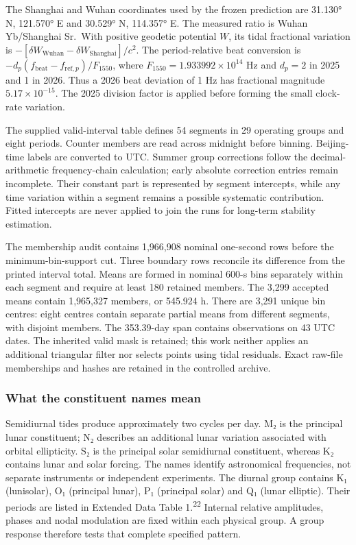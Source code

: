 \documentclass[
  10pt,
  a4paper,
]{article}
\begin{document}
The Shanghai and Wuhan coordinates used by the frozen prediction are
31.130° N, 121.570° E and 30.529° N, 114.357° E. The measured ratio is
Wuhan Yb/Shanghai Sr.~With positive geodetic potential \(W\), its tidal
fractional variation is
\(-[\delta W_{\mathrm{Wuhan}}-\delta W_{\mathrm{Shanghai}}]/c^2\). The
period-relative beat conversion is
\(-d_p(f_{\mathrm{beat}}-f_{{\mathrm{ref}},p})/F_{1550}\), where
\(F_{1550}=1.933992\times10^{14}\) Hz and \(d_p=2\) in 2025 and 1 in
2026. Thus a 2026 beat deviation of 1 Hz has fractional magnitude
\(5.17\times10^{-15}\). The 2025 division factor is applied before
forming the small clock-rate variation.

The supplied valid-interval table defines 54 segments in 29 operating
groups and eight periods. Counter members are read across midnight
before binning. Beijing-time labels are converted to UTC. Summer group
corrections follow the decimal-arithmetic frequency-chain calculation;
early absolute correction entries remain incomplete. Their constant part
is represented by segment intercepts, while any time variation within a
segment remains a possible systematic contribution. Fitted intercepts
are never applied to join the runs for long-term stability estimation.

The membership audit contains 1,966,908 nominal one-second rows before
the minimum-bin-support cut. Three boundary rows reconcile its
difference from the printed interval total. Means are formed in nominal
600-s bins separately within each segment and require at least 180
retained members. The 3,299 accepted means contain 1,965,327 members, or
545.924 h. There are 3,291 unique bin centres: eight centres contain
separate partial means from different segments, with disjoint members.
The 353.39-day span contains observations on 43 UTC dates. The inherited
valid mask is retained; this work neither applies an additional
triangular filter nor selects points using tidal residuals. Exact
raw-file memberships and hashes are retained in the controlled archive.

\hypertarget{what-the-constituent-names-mean}{%
\subsubsection{What the constituent names
mean}\label{what-the-constituent-names-mean}}

Semidiurnal tides produce approximately two cycles per day. M₂ is the
principal lunar constituent; N₂ describes an additional lunar variation
associated with orbital ellipticity. S₂ is the principal solar
semidiurnal constituent, whereas K₂ contains lunar and solar forcing.
The names identify astronomical frequencies, not separate instruments or
independent experiments. The diurnal group contains K₁ (lunisolar), O₁
(principal lunar), P₁ (principal solar) and Q₁ (lunar elliptic). Their
periods are listed in Extended Data Table 1.\textsuperscript{22}
Internal relative amplitudes, phases and nodal modulation are fixed
within each physical group. A group response therefore tests that
complete specified pattern.
\end{document}
